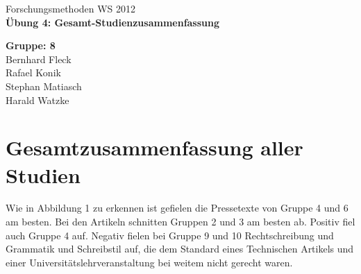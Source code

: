 

 

\begin{titlepage}
\sffamily

{ \Large Forschungsmethoden WS 2012} \\[2cm]
    
{ \Huge \centering \bfseries Übung 4: Gesamt-Studienzusammenfassung \\[1.5cm] }


%

\vfill

{ \large
   { \bfseries Gruppe: 8 \\ }
   Bernhard Fleck \\
   Rafael Konik \\
   Stephan Matiasch \\
   Harald Watzke \\
}
\end{titlepage}


\section{Gesamtzusammenfassung aller Studien} %
\label{sec:zusammenfassung_aller_studien}

Wie in Abbildung 1 zu erkennen ist gefielen die Pressetexte von Gruppe 4 und 6 am besten. Bei den Artikeln schnitten Gruppen 2 und 3 am besten ab. Positiv fiel auch Gruppe 4 auf. Negativ fielen bei Gruppe 9 und 10 Rechtschreibung und Grammatik und Schreibstil auf, die dem Standard eines Technischen Artikels und einer Universitätslehrveranstaltung bei weitem nicht gerecht waren.

